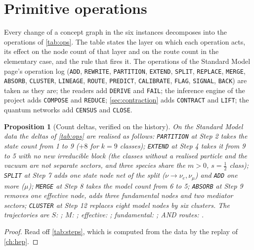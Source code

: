 \documentclass[11pt,a4paper,twoside,openany]{report}
\theoremstyle{plain}
\newtheorem{proposition}[theorem]{Proposition}
\theoremstyle{definition}
\theoremstyle{remark}
\newcommand{\op}[1]{\texttt{\MakeUppercase{#1}}}
\begin{document}
\section{Primitive operations}
Every change of a concept graph in the six instances decomposes into the operations of \cref{tab:ops}. The table states the layer on which each operation acts, its effect on the node count of that layer and on the route count in the elementary case, and the rule that fires it. The operations of the Standard Model page's operation log (\op{add}, \op{rewrite}, \op{partition}, \op{extend}, \op{split}, \op{replace}, \op{merge}, \op{absorb}, \op{cluster}, \op{lineage}, \op{route}, \op{predict}, \op{calibrate}, \op{flag}, \op{signal}, \op{back}) are taken as they are; the readers add \op{derive} and \op{fail}; the inference engine of the project adds \op{compose} and \op{reduce}; \cref{sec:contraction} adds \op{contract} and \op{lift}; the quantum networks add \op{census} and \op{close}.
\begin{table}[htbp]\centering\scriptsize
\caption{Primitive operations with their count deltas.}\label{tab:ops}

\end{table}

\begin{proposition}[Count deltas, verified on the history]\label{prop:deltas}
On the Standard Model data the deltas of \cref{tab:ops} are realised as follows: \op{partition} at Step 2 takes the state count from 1 to 9 ($+8$ for $k=9$ classes); \op{extend} at Step 4 takes it from 9 to 5 with no new irreducible block (the classes without a realised particle and the vacuum are not separate sectors, and three species share the $m>0$, $s=\tfrac12$ class); \op{split} at Step 7 adds one state node net of the split ($\nu\to\nu_e,\nu_\mu$) and \op{add} one more ($\mu$); \op{merge} at Step 8 takes the model count from 6 to 5; \op{absorb} at Step 9 removes one effective node, adds three fundamental nodes and two mediator sectors; \op{cluster} at Step 12 replaces eight model nodes by six clusters. The trajectories are $S$: \NhepTrajS; $M$: \NhepTrajM; effective: \NhepTrajEff; fundamental: \NhepTrajFund; AND routes: \NhepTrajAND.
\end{proposition}
\begin{proof}
Read off \cref{tab:steps}, which is computed from the data by the replay of \cref{ch:hep}.
\end{proof}
\end{document}
